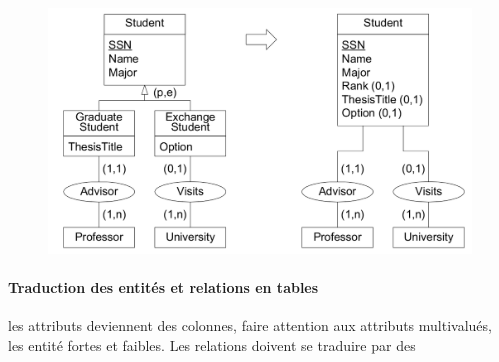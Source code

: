 \documentclass[a4paper]{article}
\begin{document}
\begin{figure}[H]
    \center
    \includegraphics[width=.7\textwidth]{fig/er2rm-1.png}
\end{figure}

\paragraph{Traduction des entités et relations en tables} les attributs deviennent
des colonnes, faire attention aux attributs multivalués, les entité fortes et faibles.
Les relations doivent se traduire par des 
\end{document}
